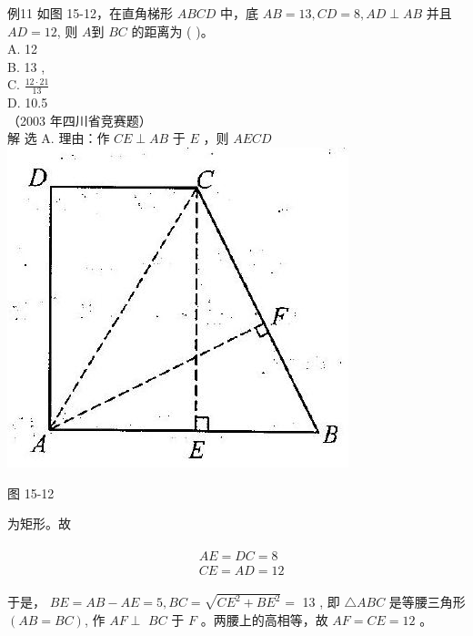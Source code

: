 \documentclass[10pt]{article}
\begin{document}
例11 如图 15-12，在直角梯形 $A B C D$ 中，底 $A B=13, C D=8, A D \perp A B$ 并且 $A D=12$, 则 $A$到 $B C$ 的距离为 ( )。\\
A. 12\\
B. 13 ,\\
C. $\frac{12 \cdot 21}{13}$\\
D. 10.5\\
（2003 年四川省竞赛题）\\
解 选 A. 理由：作 $C E \perp A B$ 于 $E$ ，则 $A E C D$\\
\includegraphics[max width=\textwidth, center]{2024_10_30_2c8f45efd4a519b08e1ag-142(1)}

图 15-12

为矩形。故

\begin{align*}
\begin{aligned}
& A E=D C=8 \\
& C E=A D=12
\end{aligned}
\end{align*}

于是， $B E=A B-A E=5, B C=\sqrt{C E^{2}+B E^{2}}=$ 13 , 即 $\triangle A B C$ 是等腰三角形 $(A B=B C)$, 作 $A F \perp$ $B C$ 于 $F$ 。两腰上的高相等，故 $A F=C E=12$ 。
\end{document}

